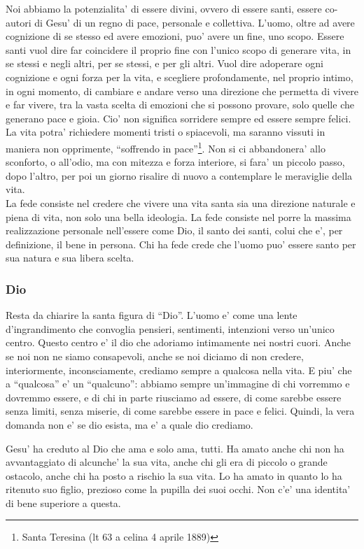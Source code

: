 Noi abbiamo la potenzialita' di essere divini, ovvero di essere santi, essere co-autori di Gesu' di un regno di pace, personale e collettiva. 
L'uomo, oltre ad avere cognizione di se stesso ed avere emozioni, puo' avere un fine, uno scopo. Essere santi vuol dire far coincidere il proprio fine con l'unico scopo di generare vita, in se stessi e negli altri, per se stessi, e per gli altri. Vuol dire adoperare ogni cognizione e ogni forza per la vita, e scegliere profondamente, nel proprio intimo, in ogni momento, di cambiare e andare verso una direzione che permetta di vivere e far vivere, tra la vasta scelta di emozioni che si possono provare, solo quelle che generano pace e gioia. Cio' non significa sorridere sempre ed essere sempre felici. La vita potra' richiedere momenti tristi o spiacevoli, ma saranno vissuti in maniera non opprimente, ``soffrendo in pace''\footnote{Santa Teresina (lt 63 a celina 4 aprile 1889)}. Non si ci abbandonera' allo sconforto, o all'odio, ma con mitezza e forza interiore, si fara' un piccolo passo, dopo l'altro, per poi un giorno risalire di nuovo a contemplare le meraviglie della vita.  \\
La fede consiste nel credere che vivere una vita santa sia una direzione naturale e piena di vita, non solo una bella ideologia. La fede consiste nel porre la massima realizzazione personale nell'essere come Dio, il santo dei santi, colui che e', per definizione, il bene in persona. Chi ha fede crede che l'uomo puo' essere santo per sua natura e sua libera scelta.


\subsubsection{Dio}

Resta da chiarire la santa figura di ``Dio''. L'uomo e' come una lente d'ingrandimento che convoglia pensieri, sentimenti, intenzioni verso un'unico centro. Questo centro e' il dio che adoriamo intimamente nei nostri cuori. Anche se noi non ne siamo consapevoli, anche se noi diciamo di non credere, interiormente, inconsciamente, crediamo sempre a qualcosa nella vita. E piu' che a ``qualcosa'' e' un ``qualcuno'': abbiamo sempre un'immagine di chi vorremmo e dovremmo essere, e di chi in parte riusciamo ad essere, di come sarebbe essere senza limiti, senza miserie, di come sarebbe essere in pace e felici. Quindi, la vera domanda non e' se dio esista, ma e' a quale dio crediamo.

Gesu' ha creduto al Dio che ama e solo ama, tutti. Ha amato anche chi non ha avvantaggiato di alcunche' la sua vita, anche chi gli era di piccolo o grande ostacolo, anche chi ha posto a rischio la sua vita. Lo ha amato in quanto lo ha ritenuto suo figlio, prezioso come la pupilla dei suoi occhi. Non c'e' una identita' di bene superiore a questa.

